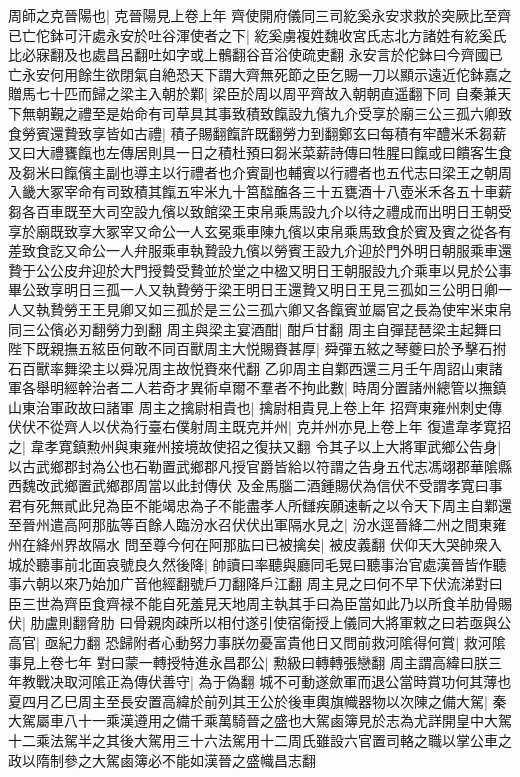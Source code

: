 周師之克晉陽也|{
	克晉陽見上卷上年}
齊使開府儀同三司紇奚永安求救於突厥比至齊已亡佗鉢可汗處永安於吐谷渾使者之下|{
	紇奚虜複姓魏收宮氏志北方諸姓有紇奚氏比必寐翻及也處昌呂翻吐如字或上鶻翻谷音浴使疏吏翻}
永安言於佗鉢曰今齊國已亡永安何用餘生欲閉氣自絶恐天下謂大齊無死節之臣乞賜一刀以顯示遠近佗鉢嘉之贈馬七十匹而歸之梁主入朝於鄴|{
	梁臣於周以周平齊故入朝朝直遥翻下同}
自秦兼天下無朝覲之禮至是始命有司草具其事致積致餼設九儐九介受享於廟三公三孤六卿致食勞賓還贄致享皆如古禮|{
	積子賜翻餼許既翻勞力到翻鄭玄曰每積有牢醴米禾芻薪又曰大禮饔餼也左傳居則具一日之積杜預曰芻米菜薪詩傳曰牲腥曰餼或曰饋客生食及芻米曰餼儐主副也導主以行禮者也介賓副也輔賓以行禮者也五代志曰梁王之朝周入畿大冢宰命有司致積其餼五牢米九十筥䤈醢各三十五甕酒十八壺米禾各五十車薪芻各百車既至大司空設九儐以致館梁王束帛乘馬設九介以待之禮成而出明日王朝受享於廟既致享大冢宰又命公一人玄冕乘車陳九儐以束帛乘馬致食於賓及賓之從各有差致食訖又命公一人弁服乘車執贄設九儐以勞賓王設九介迎於門外明日朝服乘車還贄于公公皮弁迎於大門授䞇受贄並於堂之中楹又明日王朝服設九介乘車以見於公事畢公致享明日三孤一人又執贄勞于梁王明日王還贄又明日王見三孤如三公明日卿一人又執贄勞王王見卿又如三孤於是三公三孤六卿又各餼賓並屬官之長為使牢米束帛同三公儐必刃翻勞力到翻}
周主與梁主宴酒酣|{
	酣戶甘翻}
周主自彈琵琶梁主起舞曰陛下既親撫五絃臣何敢不同百獸周主大悦賜賚甚厚|{
	舜彈五絃之琴夔曰於予擊石拊石百獸率舞梁主以舜况周主故悦賚來代翻}
乙卯周主自鄴西還三月壬午周詔山東諸軍各舉明經幹治者二人若奇才異術卓爾不羣者不拘此數|{
	時周分置諸州總管以撫鎮山東治軍政故曰諸軍}
周主之擒尉相貴也|{
	擒尉相貴見上卷上年}
招齊東雍州刺史傳伏伏不從齊人以伏為行臺右僕射周主既克并州|{
	克并州亦見上卷上年}
復遣韋孝寛招之|{
	韋孝寛鎮勲州與東雍州接境故使招之復扶又翻}
令其子以上大將軍武鄉公告身|{
	以古武鄉郡封為公也石勒置武鄉郡凡授官爵皆給以符謂之告身五代志馮翊郡華隂縣西魏改武鄉置武鄉郡周當以此封傳伏}
及金馬腦二酒鍾賜伏為信伏不受謂孝寛曰事君有死無貳此兒為臣不能竭忠為子不能盡孝人所讎疾願速斬之以令天下周主自鄴還至晉州遣高阿那肱等百餘人臨汾水召伏伏出軍隔水見之|{
	汾水逕晉絳二州之間東雍州在絳州界故隔水}
問至尊今何在阿那肱曰已被擒矣|{
	被皮義翻}
伏仰天大哭帥衆入城於聽事前北面哀號良久然後降|{
	帥讀曰率聽與廳同毛晃曰聽事治官處漢晉皆作聽事六朝以來乃始加广音他經翻號戶刀翻降戶江翻}
周主見之曰何不早下伏流涕對曰臣三世為齊臣食齊禄不能自死羞見天地周主執其手曰為臣當如此乃以所食羊肋骨賜伏|{
	肋盧則翻脅肋}
曰骨親肉疎所以相付遂引使宿衛授上儀同大將軍敕之曰若亟與公高官|{
	亟紀力翻}
恐歸附者心動努力事朕勿憂富貴他日又問前救河隂得何賞|{
	救河隂事見上卷七年}
對曰蒙一轉授特進永昌郡公|{
	勲級曰轉轉張戀翻}
周主謂高緯曰朕三年教戰决取河隂正為傳伏善守|{
	為于偽翻}
城不可動遂歛軍而退公當時賞功何其薄也夏四月乙巳周主至長安置高緯於前列其王公於後車輿旗幟器物以次陳之備大駕|{
	秦大駕屬車八十一乘漢遵用之備千乘萬騎晉之盛也大駕鹵簿見於志為尤詳開皇中大駕十二乘法駕半之其後大駕用三十六法駕用十二周氏雖設六官置司輅之職以掌公車之政以隋制參之大駕鹵簿必不能如漢晉之盛幟昌志翻}
